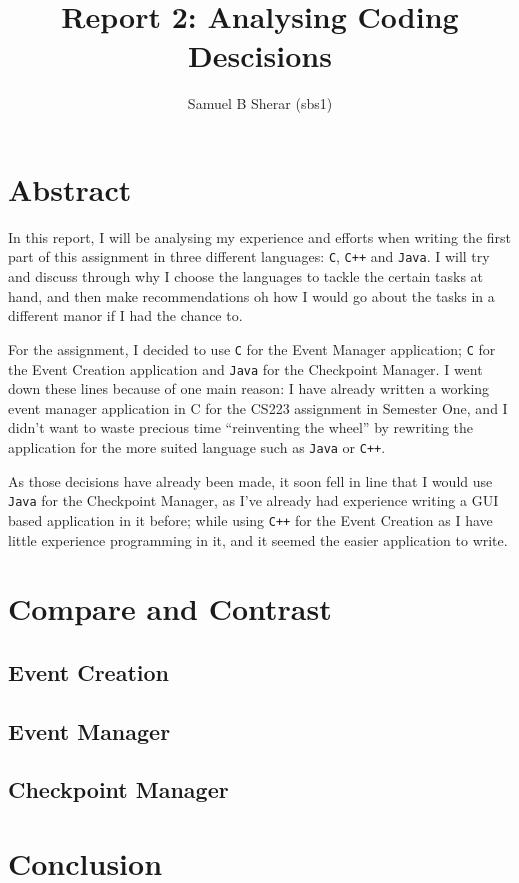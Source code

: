 \documentclass[a4paper]{article}
\begin{document}
\title{Report 2: Analysing Coding Descisions}
\author{Samuel B Sherar (sbs1)}

\maketitle
\newpage

\section*{Abstract}

In this report, I will be analysing my experience and efforts when writing the first part of this assignment in three different languages: \texttt{C}, \texttt{C++} and \texttt{Java}. I will try and discuss through why I choose the languages to tackle the certain tasks at hand, and then make recommendations oh how I would go about the tasks in a different manor if I had the chance to.

For the assignment, I decided to use \texttt{C} for the Event Manager application; \texttt{C} for the Event Creation application and \texttt{Java} for the Checkpoint Manager. I went down these lines because of one main reason: I have already written a working event manager application in C for the CS223 assignment in Semester One, and I didn't want to waste precious time ``reinventing the wheel'' by rewriting the application for the more suited language such as \texttt{Java} or \texttt{C++}.

As those decisions have already been made, it soon fell in line that I would use \texttt{Java} for the Checkpoint Manager, as I've already had experience writing a GUI based application in it before; while using \texttt{C++} for the Event Creation as I have little experience programming in it, and it seemed the easier application to write.


\section*{Compare and Contrast}

\subsection*{Event Creation}

\subsection*{Event Manager}

\subsection*{Checkpoint Manager}


\section*{Conclusion}
\end{document}
